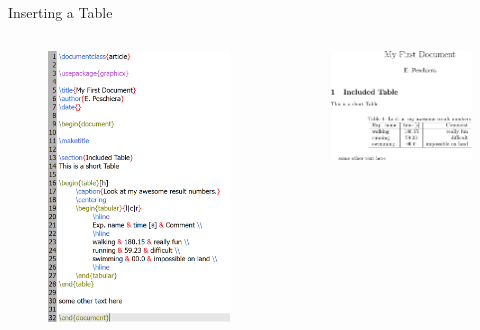 \begin{frame}[fragile]{Inserting a Table}
	\begin{columns}[t]
		\begin{column}{.5\textwidth}
			\begin{figure}
			\includegraphics[scale=.35]{Figures/code3}
			\end{figure}
		\end{column}
		\begin{column}{.5\textwidth}
			\begin{figure}
			\includegraphics[width=.85\linewidth, frame, trim={-1cm -1cm -1cm -1cm},clip]{Figures/doc4}

\end{figure}
\end{column}
\end{columns}
\end{frame}
